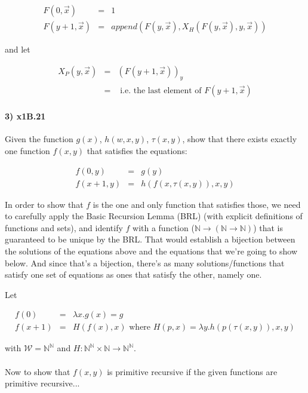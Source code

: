 \documentclass{article}
\begin{document}
\[
\begin{array}{rcl}
  F(0, \overrightarrow{x}) & = & 1 \\
  F(y+1, \overrightarrow{x}) & = & append(F(y,\overrightarrow{x}), X_H(F(y,\overrightarrow{x}), y, \overrightarrow{x}))
\end{array}
\]

and let

\[
\begin{array}{rcl}
  X_P(y, \overrightarrow{x}) & = & (F(y+1,\overrightarrow{x}))_y \\
  & = & \text{ i.e. the last element of } F(y+1,\overrightarrow{x})
\end{array} 
\]



\paragraph{3) x1B.21} Given the function $g(x)$, $h(w,x,y)$, $\tau (x,y)$, show that there exists exactly one function $f(x,y)$ that satisfies the equations:

\[
\begin{array}{rcl}
  f(0,y) & = & g(y) \\
  f(x + 1, y) & = & h(f(x,\tau (x,y)), x, y)
\end{array} 
\]

In order to show that $f$ is the one and only function that satisfies
those, we need to carefully apply the Basic Recursion Lemma (BRL)
(with explicit definitions of functions and sets), and identify $f$
with a function ($\mathbb{N} \rightarrow (\mathbb{N} \rightarrow
\mathbb{N})$) that is guaranteed to be unique by the BRL. That would
establish a bijection between the solutions of the equations above and
the equations that we're going to show below. And since that's a
bijection, there's as many solutions/functions that satisfy one set of
equations as ones that satisfy the other, namely one.

Let

\[
\begin{array}{rcl}
  f(0) & = & \lambda x.g(x) = g \\
  f(x + 1) & = & H(f(x),x) \text{  where } H(p,x) = \lambda y. h(p(\tau (x,y)), x, y)
\end{array} 
\]

with $\mathcal{W} = \mathbb{N}^{\mathbb{N}}$ and $H: \mathbb{N}^{\mathbb{N}} \times \mathbb{N} \rightarrow \mathbb{N}^{\mathbb{N}}$.



\paragraph{} Now to show that $f(x,y)$ is primitive recursive if the given
functions are primitive recursive...
\end{document}
